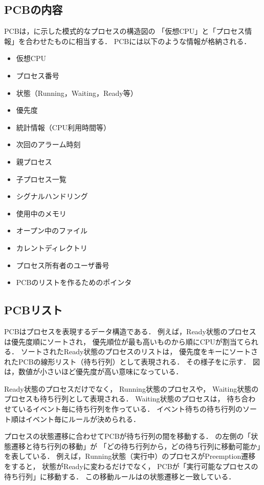 \subsection{PCBの内容}
PCBは，に示した模式的なプロセスの構造図の
「仮想CPU」と「プロセス情報」を合わせたものに相当する．
PCBには以下のような情報が格納される．

\begin{itemize}
\item 仮想CPU
\item プロセス番号
\item 状態（Running，Waiting，Ready等）
\item 優先度
\item 統計情報（CPU利用時間等）
\item 次回のアラーム時刻
\item 親プロセス
\item 子プロセス一覧
\item シグナルハンドリング
\item 使用中のメモリ
\item オープン中のファイル
\item カレントディレクトリ
\item プロセス所有者のユーザ番号
\item PCBのリストを作るためのポインタ
\end{itemize}

\subsection{PCBリスト}
PCBはプロセスを表現するデータ構造である．
例えば，Ready状態のプロセスは優先度順にソートされ，
優先順位が最も高いものから順にCPUが割当てられる．
ソートされたReady状態のプロセスのリストは，
優先度をキーにソートされたPCBの線形リスト（待ち行列）として表現される．
その様子をに示す．
図は，数値が小さいほど優先度が高い意味になっている．


Ready状態のプロセスだけでなく，
Running状態のプロセスや，
Waiting状態のプロセスも待ち行列として表現される．
Waiting状態のプロセスは，
待ち合わせているイベント毎に待ち行列を作っている．
イベント待ちの待ち行列のソート順はイベント毎にルールが決められる．

プロセスの状態遷移に合わせてPCBが待ち行列の間を移動する．
の左側の「状態遷移と待ち行列の移動」が
「どの待ち行列から，どの待ち行列に移動可能か」を表している．
例えば，Running状態（実行中）のプロセスがPreemption遷移をすると，
状態がReadyに変わるだけでなく，
PCBが「実行可能なプロセスの待ち行列」に移動する．
この移動ルールはの状態遷移と一致している．


